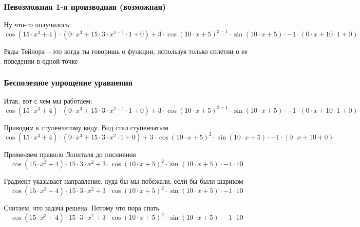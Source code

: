 \documentclass{article}
\begin{document}
\subsubsection*{Невозможная 1-я производная (возможная)}

Ну что-то получилось:\\
\begin{dmath*}
\cos(15 \cdot x^{3} + 4) \cdot (0 \cdot x^{3} + 15 \cdot 3 \cdot x^{3 - 1} \cdot 1 + 0) + 3 \cdot \cos(10 \cdot x + 5)^{3 - 1} \cdot \sin(10 \cdot x + 5) \cdot -1 \cdot (0 \cdot x + 10 \cdot 1 + 0)
\end{dmath*}


Ряды Тейлора – это когда ты говоришь о функции, используя только сплетни о ее поведении в одной точке 
\subsubsection*{Бесполезное упрощение уравнения}

Итак, вот с чем мы работаем:\\
\begin{dmath*}
\cos(15 \cdot x^{3} + 4) \cdot (0 \cdot x^{3} + 15 \cdot 3 \cdot x^{3 - 1} \cdot 1 + 0) + 3 \cdot \cos(10 \cdot x + 5)^{3 - 1} \cdot \sin(10 \cdot x + 5) \cdot -1 \cdot (0 \cdot x + 10 \cdot 1 + 0)
\end{dmath*}


Приводим к ступенчатому виду. Вид стал ступенчатым 
\begin{dmath*}
\cos(15 \cdot x^{3} + 4) \cdot (0 \cdot x^{3} + 15 \cdot 3 \cdot x^{2} \cdot 1 + 0) + 3 \cdot \cos(10 \cdot x + 5)^{2} \cdot \sin(10 \cdot x + 5) \cdot -1 \cdot (0 \cdot x + 10 + 0)
\end{dmath*}


Применяем правило Лопиталя до посинения 
\begin{dmath*}
\cos(15 \cdot x^{3} + 4) \cdot 15 \cdot 3 \cdot x^{2} + 3 \cdot \cos(10 \cdot x + 5)^{2} \cdot \sin(10 \cdot x + 5) \cdot -1 \cdot 10
\end{dmath*}


Градиент указывает направление, куда бы мы побежали, если бы были шариком 
\begin{dmath*}
\cos(15 \cdot x^{3} + 4) \cdot 15 \cdot 3 \cdot x^{2} + 3 \cdot \cos(10 \cdot x + 5)^{2} \cdot \sin(10 \cdot x + 5) \cdot -1 \cdot 10
\end{dmath*}


Считаем, что задача решена. Потому что пора спать 
\begin{dmath*}
\cos(15 \cdot x^{3} + 4) \cdot 15 \cdot 3 \cdot x^{2} + 3 \cdot \cos(10 \cdot x + 5)^{2} \cdot \sin(10 \cdot x + 5) \cdot -1 \cdot 10
\end{dmath*}
\end{document}

